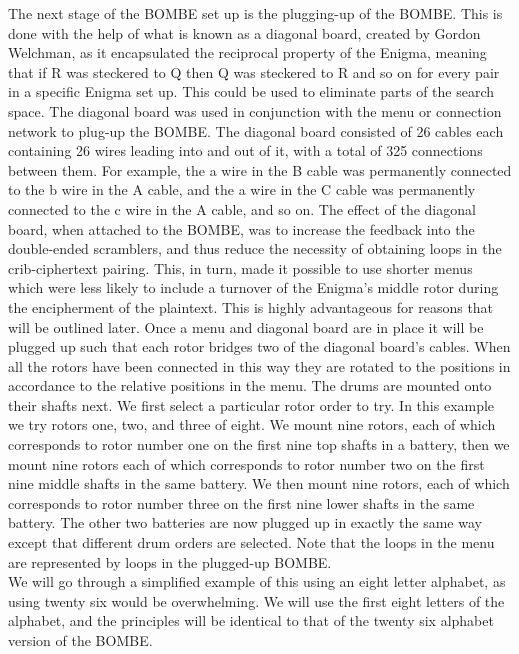 \documentclass[12pt,a4paper]{article}
\begin{document}
The next stage of the BOMBE set up is the plugging-up of the BOMBE. This is done with the help of what is known as a diagonal board, created by Gordon Welchman, as it encapsulated the reciprocal property of the Enigma, meaning that if R was steckered to Q then Q was steckered to R and so on for every pair in a specific Enigma set up. This could be used to eliminate parts of the search space. The diagonal board was used in conjunction with the menu or connection network to plug-up the BOMBE. The diagonal board consisted of 26 cables each containing 26 wires leading into and out of it, with a total of 325 connections between them. For example, the a wire in the B cable was permanently connected to the b wire in the A cable, and the a wire in the C cable was permanently connected to the c wire in the A cable, and so on. The effect of the diagonal board, when attached to the BOMBE, was to increase the feedback into the double-ended scramblers, and thus reduce the necessity of obtaining loops in the crib-ciphertext pairing. This, in turn, made it possible to use shorter menus which were less likely to include a turnover of the Enigma's middle rotor during the encipherment of the plaintext. This is highly advantageous for reasons that will be outlined later. Once a menu and diagonal board are in place it will be plugged up such that each rotor bridges two of the diagonal board's cables. When all the rotors have been connected in this way they are rotated to the positions in accordance to the relative positions in the menu. The drums are mounted onto their shafts next. We first select a particular rotor order to try. In this example we try rotors one, two, and three of eight. We mount nine rotors, each of which corresponds to rotor number one on the first nine top shafts in a battery, then we mount nine rotors each of which corresponds to rotor number two on the first nine middle shafts in the same battery. We then mount nine rotors, each of which corresponds to rotor number three on the first nine lower shafts in the same battery. The other two batteries are now plugged up in exactly the same way except that different drum orders are selected. Note that the loops in the menu are represented by loops in the plugged-up BOMBE.\\

We will go through a simplified example of this using an eight letter alphabet, as using twenty six would be overwhelming. We will use the first eight letters of the alphabet, and the principles will be identical to that of the twenty six alphabet version of the BOMBE.
\end{document}
